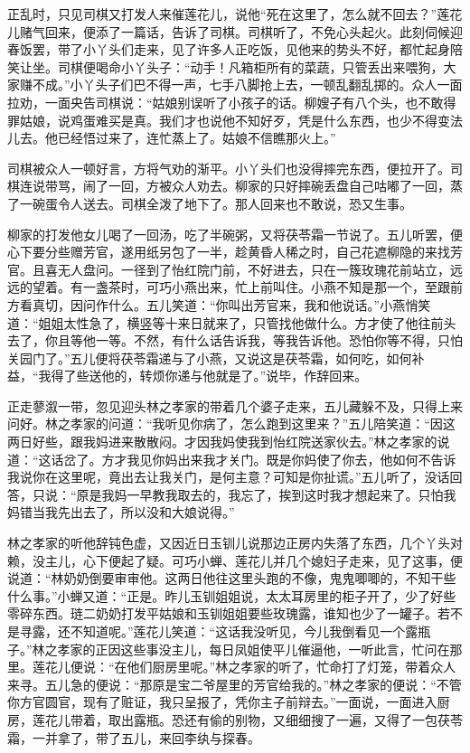 正乱时，只见司棋又打发人来催莲花儿，说他“死在这里了，怎么就不回去？”莲花儿赌气回来，便添了一篇话，告诉了司棋。司棋听了，不免心头起火。此刻伺候迎春饭罢，带了小丫头们走来，见了许多人正吃饭，见他来的势头不好，都忙起身陪笑让坐。司棋便喝命小丫头子：“动手！凡箱柜所有的菜蔬，只管丢出来喂狗，大家赚不成。”小丫头子们巴不得一声，七手八脚抢上去，一顿乱翻乱掷的。众人一面拉劝，一面央告司棋说：“姑娘别误听了小孩子的话。柳嫂子有八个头，也不敢得罪姑娘，说鸡蛋难买是真。我们才也说他不知好歹，凭是什么东西，也少不得变法儿去。他已经悟过来了，连忙蒸上了。姑娘不信瞧那火上。”

司棋被众人一顿好言，方将气劝的渐平。小丫头们也没得摔完东西，便拉开了。司棋连说带骂，闹了一回，方被众人劝去。柳家的只好摔碗丢盘自己咕嘟了一回，蒸了一碗蛋令人送去。司棋全泼了地下了。那人回来也不敢说，恐又生事。

柳家的打发他女儿喝了一回汤，吃了半碗粥，又将茯苓霜一节说了。五儿听罢，便心下要分些赠芳官，遂用纸另包了一半，趁黄昏人稀之时，自己花遮柳隐的来找芳官。且喜无人盘问。一径到了怡红院门前，不好进去，只在一簇玫瑰花前站立，远远的望着。有一盏茶时，可巧小燕出来，忙上前叫住。小燕不知是那一个，至跟前方看真切，因问作什么。五儿笑道：“你叫出芳官来，我和他说话。”小燕悄笑道：“姐姐太性急了，横竖等十来日就来了，只管找他做什么。方才使了他往前头去了，你且等他一等。不然，有什么话告诉我，等我告诉他。恐怕你等不得，只怕关园门了。”五儿便将茯苓霜递与了小燕，又说这是茯苓霜，如何吃，如何补益，“我得了些送他的，转烦你递与他就是了。”说毕，作辞回来。

正走蓼溆一带，忽见迎头林之孝家的带着几个婆子走来，五儿藏躲不及，只得上来问好。林之孝家的问道：“我听见你病了，怎么跑到这里来？”五儿陪笑道：“因这两日好些，跟我妈进来散散闷。才因我妈使我到怡红院送家伙去。”林之孝家的说道：“这话岔了。方才我见你妈出来我才关门。既是你妈使了你去，他如何不告诉我说你在这里呢，竟出去让我关门，是何主意？可知是你扯谎。”五儿听了，没话回答，只说：“原是我妈一早教我取去的，我忘了，挨到这时我才想起来了。只怕我妈错当我先出去了，所以没和大娘说得。”

林之孝家的听他辞钝色虚，又因近日玉钏儿说那边正房内失落了东西，几个丫头对赖，没主儿，心下便起了疑。可巧小蝉、莲花儿并几个媳妇子走来，见了这事，便说道：“林奶奶倒要审审他。这两日他往这里头跑的不像，鬼鬼唧唧的，不知干些什么事。”小蝉又道：“正是。昨儿玉钏姐姐说，太太耳房里的柜子开了，少了好些零碎东西。琏二奶奶打发平姑娘和玉钏姐姐要些玫瑰露，谁知也少了一罐子。若不是寻露，还不知道呢。”莲花儿笑道：“这话我没听见，今儿我倒看见一个露瓶子。”林之孝家的正因这些事没主儿，每日凤姐使平儿催逼他，一听此言，忙问在那里。莲花儿便说：“在他们厨房里呢。”林之孝家的听了，忙命打了灯笼，带着众人来寻。五儿急的便说：“那原是宝二爷屋里的芳官给我的。”林之孝家的便说：“不管你方官圆官，现有了赃证，我只呈报了，凭你主子前辩去。”一面说，一面进入厨房，莲花儿带着，取出露瓶。恐还有偷的别物，又细细搜了一遍，又得了一包茯苓霜，一并拿了，带了五儿，来回李纨与探春。

